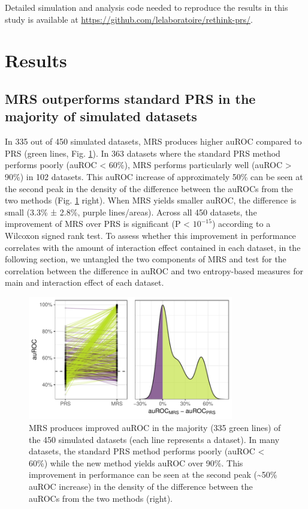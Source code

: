 \documentclass{ws-procs11x85}
\begin{document}
Detailed simulation and analysis code needed to reproduce the results in
this study is available at
\url{https://github.com/lelaboratoire/rethink-prs/}.


\section{Results}\label{results}

\subsection{MRS outperforms standard PRS in the majority of simulated
datasets}\label{mrs-outperforms-standard-prs-in-the-majority-of-simulated-datasets}

In 335 out of 450 simulated datasets, MRS produces higher auROC compared
to PRS (green lines, Fig. \ref{fig:auroc_mrs_prs}). In 363 datasets
where the standard PRS method performs poorly (auROC \textless{} 60\%),
MRS performs particularly well (auROC \textgreater{} 90\%) in 102
datasets. This auROC increase of approximately 50\% can be seen at the second peak in the density of the difference between the auROCs from the two methods (Fig. \ref{fig:auroc_mrs_prs} right).
When MRS yields smaller auROC, the difference is small (3.3\%
± 2.8\%, purple lines/areas). Across all 450 datasets, the improvement of
MRS over PRS is significant (P \textless{} \(10^{-15}\)) according to a
Wilcoxon signed rank test. To assess whether this improvement in
performance correlates with the amount of interaction effect contained
in each dataset, in the following section, we untangled the two
components of MRS and test for the correlation between the difference in
auROC and two entropy-based measures for main and interaction effect of
each dataset.

\begin{figure}
\centering
\includegraphics[width=0.8\textwidth]{../content/images/1_ori_vs_MRS_auROC_.pdf}
\caption{MRS produces improved auROC in the majority (335 green lines)
of the 450 simulated datasets (each line represents a dataset). In many
datasets, the standard PRS method performs poorly (auROC \textless{}
60\%) while the new method yields auROC over 90\%. This improvement in
performance can be seen at the second peak (\textasciitilde{}50\% auROC
increase) in the density of the difference between the auROCs from the
two methods (right).}
\label{fig:auroc_mrs_prs}
\end{figure}
\end{document}
